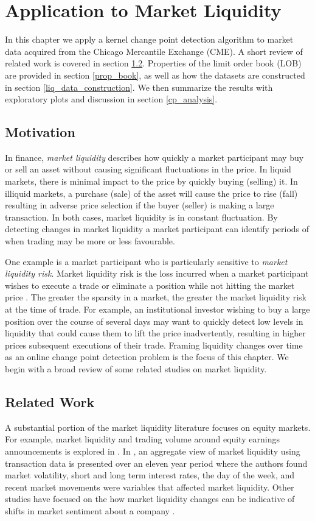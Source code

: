 \chapter{Application to Market Liquidity}
In this chapter we apply a kernel change point detection algorithm to market data acquired from the Chicago Mercantile Exchange (CME). A short review of related work is covered in section \ref{related_work}. Properties of the limit order book (LOB) are provided in section \ref{prop_book}, as well as how the datasets are constructed in section \ref{liq_data_construction}. We then summarize the results with exploratory plots and discussion in section \ref{cp_analysis}.

\section{Motivation}
In finance, \textit{market liquidity} describes how quickly a market participant may buy or sell an asset without causing significant fluctuations in the price. In liquid markets, there is minimal impact to the price by quickly buying (selling) it. In illiquid markets, a purchase (sale) of the asset will cause the price to rise (fall) resulting in adverse price selection if the buyer (seller) is making a large transaction. In both cases, market liquidity is in constant fluctuation. By detecting changes in market liquidity a market participant can identify periods of when trading may be more or less favourable. 

One example is a market participant who is particularly sensitive to \textit{market liquidity risk}. Market liquidity risk is the loss incurred when a market participant wishes to execute a trade or eliminate a position while not hitting the
market price \cite{basel2008principles}. The greater the sparsity in a market, the greater the market liquidity risk at the time of trade.  For example, an institutional investor wishing to buy a large position over the course of several days may want to quickly detect low levels in liquidity that could cause them to lift the price inadvertently, resulting in higher prices subsequent executions of their trade. Framing liquidity changes over time as an online change point detection problem is the focus of this chapter. We begin with a broad review of some related studies on market liquidity.

\section{Related Work}
\label{related_work}
A substantial portion of the market liquidity literature focuses on equity markets. For example, market liquidity and trading volume around equity earnings announcements is explored in \cite{kim1994market}. In \cite{chordia2001market}, an aggregate view of market liquidity using transaction data is presented over an eleven year period where the authors found market volatility, short and long term interest rates, the day of the week, and recent market movements were variables that affected market liquidity. Other studies have focused on the how market liquidity changes can be indicative of shifts in market sentiment about a company \cite{baker2004market} \cite{fang2009stock} \cite{debata2018investor}.

